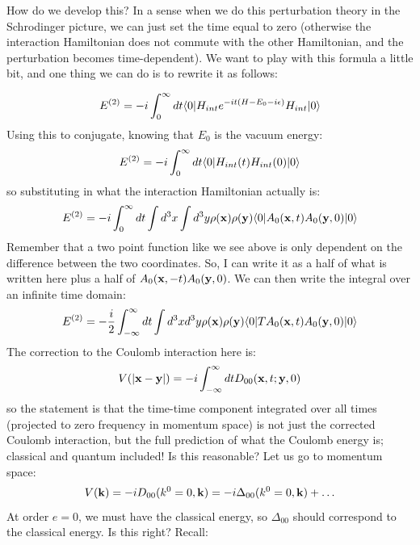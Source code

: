 How do we develop this? In a sense when we do this perturbation theory in the Schrodinger picture, we can just set the time equal to zero (otherwise the interaction Hamiltonian does not commute with the other Hamiltonian, and the perturbation becomes time-dependent). We want to play with this formula a little bit, and one thing we can do is to rewrite it as follows:

\begin{equation}
    E^{(2)} = -i\int_0^\infty dt \langle 0 \rvert H_{int}e^{-it(H - E_0 - i\epsilon)}H_{int}\lvert 0 \rangle
\end{equation}
Using this to conjugate, knowing that $E_0$ is the vacuum energy:
\begin{equation}
    E^{(2)} = -i\int_0^\infty dt \langle 0 \rvert H_{int}(t)H_{int}(0)\lvert 0 \rangle
\end{equation}
so substituting in what the interaction Hamiltonian actually is:
\begin{equation}
    E^{(2)} = -i\int_0^\infty dt \int d^3x \int d^3y \rho(\mathbf{x})\rho(\mathbf{y})\langle 0 \rvert A_0(\mathbf{x}, t)A_0(\mathbf{y}, 0)\lvert 0 \rangle
\end{equation}
Remember that a two point function like we see above is only dependent on the difference between the two coordinates. So, I can write it as a half of what is written here plus a half of $A_0(\mathbf{x}, -t)A_0(\mathbf{y}, 0)$. We can then write the integral over an infinite time domain:
\begin{equation}
    E^{(2)} = -\frac{i}{2}\int_{-\infty}^\infty dt \int d^3x d^3y \rho(\mathbf{x})\rho(\mathbf{y})\langle 0 \rvert TA_0(\mathbf{x}, t)A_0(\mathbf{y}, 0)\lvert 0 \rangle
\end{equation}
The correction to the Coulomb interaction here is:
\begin{equation}
    V(\lvert \mathbf{x} - \mathbf{y} \rvert) = -i\int_{-\infty}^\infty dt D_{00}(\mathbf{x}, t; \mathbf{y}, 0)
\end{equation}
so the statement is that the time-time component integrated over all times (projected to zero frequency in momentum space) is not just the corrected Coulomb interaction, but the full prediction of what the Coulomb energy is; classical and quantum included! Is this reasonable? Let us go to momentum space:
\begin{equation}
    V(\mathbf{k}) = -iD_{00}(k^0 = 0, \mathbf{k}) = -i\Delta_{00}(k^0 = 0, \mathbf{k}) + \ldots
\end{equation}
At order $e = 0$, we must have the classical energy, so $\Delta_{00}$ should correspond to the classical energy. Is this right? Recall:
